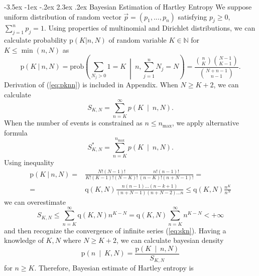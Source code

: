 \documentclass[a4paper,10pt]{article}
\makeatletter
\renewcommand\section{\@startsection {section}{1}{\z@}%
                                   {-3.5ex \@plus -1ex \@minus -.2ex}%
                                   {2.3ex \@plus.2ex}%
                                   {\large\bfseries}}
\makeatother
\begin{document}
\section {Bayesian Estimation of Hartley Entropy}
We suppose uniform distribution of random vector $\vec{p} = (p_{1},...,p_{n})$ satisfying  $p_{j} \ge 0$, $\sum_{j=1}^{n} p_{j} = 1$. Using properties of multinomial and Dirichlet distributions, we can calculate probability $\text{p}(K|n,N)$ of random variable $K \in \mathbb{N}$ for $K \le \min(n,N)$ as 
\begin{equation} 
\label{eq:pknn}
\text{p}(K \: | \: n,N) = \text{prob}\left(\sum_{N_{j} > 0}{1}=K \: \middle| \: n,\sum_{j=1}^{n}{N_{j}}=N\right) = \frac{{n \choose K}{N-1 \choose K-1}}{{N+n-1 \choose n-1}}.
\end{equation}
Derivation of (\ref{eq:pknn}) is included in Appendix. When $N \ge K+2$, we can calculate 
\begin{equation} 
\label{eq:skn}
S_{K,N} = \sum_{n=K}^{\infty}{p\left(K \: \middle| \: n,N\right)}.
\end{equation}
When the number of events is constrained as $n \leq n_{\text{max}} $, we apply alternative formula
\begin{equation} 
\label{eq:sknalt}
S_{K,N}^{*} = \sum_{n=K}^{n_{\text{max}}}{p\left(K \: \middle| \: n,N\right)}.
\end{equation}
Using inequality
\begin{equation} 
\label{eq:pknnplus}
\begin{split}
\text{p}(K \: | \: n,N) = & \frac{N!(N-1)!}{K!(K-1)!(N-K)!} \frac{n!(n-1)!}{(n-K)!(n+N-1)!} = \\ = & \text{q}(K,N) \frac{n(n-1)...(n-k+1)}{(n+N-1)(n+N-2)...n} \le \text{q}(K,N)\frac{n^K}{n^N}
\end{split}
\end{equation}
we can overestimate
\begin{equation} 
\label{eq:sknover}
S_{K,N} \le \sum_{n=K}^{\infty}{\text{q}(K,N)n^{K-N}} = \text{q}(K,N)\sum_{n=K}^{\infty}{n^{K-N}} < +\infty
\end{equation}
and then recognize the convergence of infinite series (\ref{eq:skn}). Having a knowledge of $K,N$ where $N \ge K+2$, we can calculate bayesian density
\begin{equation} 
\label{eq:pnkn}
\text{p}\left(n \: \middle| \: K,N \right) = \frac{\text{p}\left(K \: \middle| \: n,N\right)}{S_{K,N}}
\end{equation}
for $n \ge K$.
Therefore, Bayesian estimate of Hartley entropy is
\end{document}
